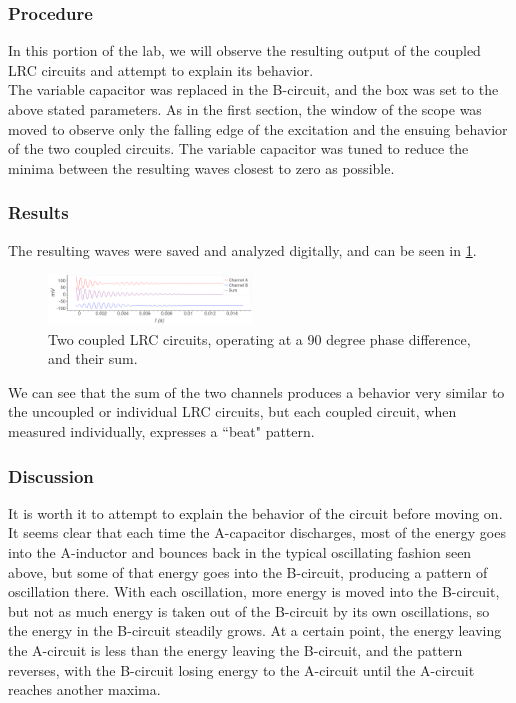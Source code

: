\documentclass[aps,prl,reprint]{revtex4-2}
\begin{document}
\subsubsection{Procedure}

In this portion of the lab, we will observe the resulting output
of the coupled LRC circuits and attempt to explain its behavior.\\

The variable capacitor was replaced in the B-circuit, and 
the box was set to the above stated parameters.  As in the first 
section, the window of the scope was moved to observe only the
falling edge of the excitation and the ensuing behavior of the
two coupled circuits. The variable capacitor was tuned to reduce
the minima between the resulting waves closest to zero as possible.\\

\subsubsection{Results}

The resulting waves were saved and analyzed digitally, and can be seen
in \ref{waves}.

\begin{figure}[h]
\includegraphics[width=0.48\textwidth]{../Images/l6_coupled_same_graph.png}
\caption{\label{waves} Two coupled LRC circuits, operating at a 90 degree
phase difference, and their sum.}
\end{figure}

We can see that the sum of the two channels produces a behavior very similar
to the uncoupled or individual LRC circuits, but each coupled circuit, when 
measured individually, expresses a ``beat" pattern.

\subsubsection{Discussion}

It is worth it to attempt to explain the behavior of the circuit before
moving on. It seems clear
that each time the A-capacitor discharges, most of the energy goes into
the A-inductor and bounces back in the typical oscillating fashion
seen above, but some of that energy goes into the B-circuit, producing a
pattern of oscillation there. With each oscillation, more energy is moved
into the B-circuit, but not as much energy is taken out of the B-circuit
by its own oscillations, so the energy in the B-circuit steadily grows. 
At a certain point, the energy leaving the A-circuit is less than the energy
leaving the B-circuit, and the pattern reverses, with the B-circuit
losing energy to the A-circuit until the A-circuit reaches another maxima. \\
\end{document}
